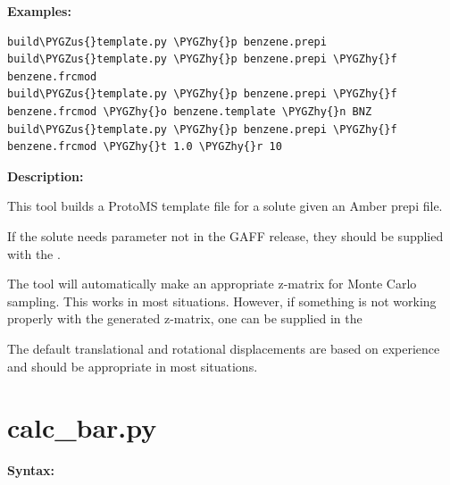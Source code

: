 \documentclass[letterpaper,10pt,english]{sphinxmanual}
\def\PYGZus{\char`\_}
\def\PYGZhy{\char`\-}
\begin{document}
\textbf{Examples:}

\begin{Verbatim}[frame=single,commandchars=\\\{\}]
build\PYGZus{}template.py \PYGZhy{}p benzene.prepi
build\PYGZus{}template.py \PYGZhy{}p benzene.prepi \PYGZhy{}f benzene.frcmod
build\PYGZus{}template.py \PYGZhy{}p benzene.prepi \PYGZhy{}f benzene.frcmod \PYGZhy{}o benzene.template \PYGZhy{}n BNZ
build\PYGZus{}template.py \PYGZhy{}p benzene.prepi \PYGZhy{}f benzene.frcmod \PYGZhy{}t 1.0 \PYGZhy{}r 10
\end{Verbatim}

\textbf{Description:}

This tool builds a ProtoMS template file for a solute given an Amber prepi file.

If the solute needs parameter not in the GAFF release, they should be supplied with the .

The tool will automatically make an appropriate z-matrix for Monte Carlo sampling. This works in most situations. However, if something is not working properly with the generated z-matrix, one can be supplied in the 

The default translational and rotational displacements are based on experience and should be appropriate in most situations.


\section{calc\_bar.py}
\label{tools:calc-bar-py}
\textbf{Syntax:}
\end{document}
